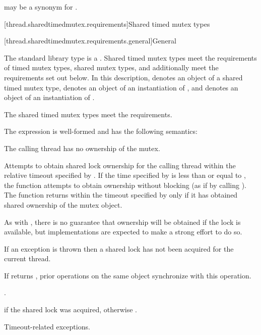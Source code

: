 \pnum
{} may be a synonym for .

[thread.sharedtimedmutex.requirements]{Shared timed mutex types}

[thread.sharedtimedmutex.requirements.general]{General}

\pnum
The standard library type  is a
. Shared timed mutex types meet the requirements of
timed mutex types,
shared mutex types, and additionally
meet the requirements set out below. In this description,
 denotes an object of a shared timed mutex type,
 denotes an object of an instantiation of
, and
 denotes an object of an instantiation of
.
\begin{note}
The shared timed mutex types meet the 
requirements.
\end{note}

\pnum
The expression  is well-formed and
has the following semantics:
\begin{itemdescr}
\pnum
\expects
The calling thread has no ownership of the mutex.

\pnum
\effects
Attempts to obtain
shared lock ownership for the calling thread within the relative
timeout specified by . If the time
specified by  is less than or equal to ,
the function attempts to obtain ownership without blocking (as if by calling
). The function returns within the timeout
specified by  only if it has obtained shared ownership of the
mutex object.
\begin{note}
As with , there is no guarantee that
ownership will be obtained if the lock is available, but implementations are
expected to make a strong effort to do so.
\end{note}
If an exception is thrown then a shared lock has not been acquired for
the current thread.

\pnum
\sync
If  returns , prior
 operations on the same object synchronize
with this operation.

\pnum
\returntype {}.

\pnum
\returns
{} if the shared lock was acquired, otherwise .

\pnum
\throws
Timeout-related exceptions.
\end{itemdescr}

